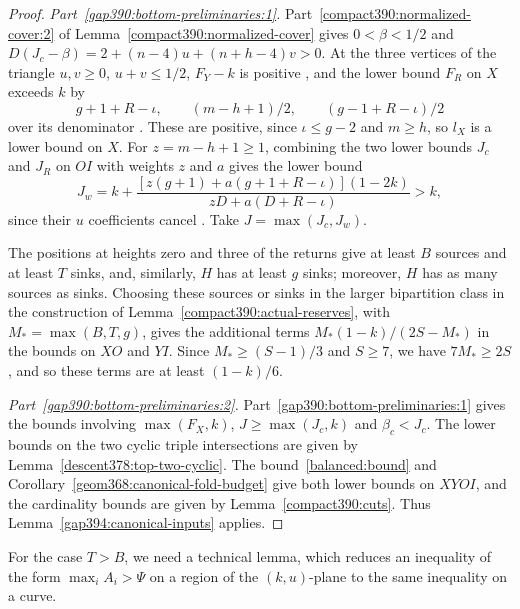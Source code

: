 \begin{proof}
\emph{Part~\ref{gap390:bottom-preliminaries:1}.} Part~\ref{compact390:normalized-cover:2} of Lemma~\ref{compact390:normalized-cover} gives $0<\beta<1/2$ and
$D(J_c-\beta)=2+(n-4)u+(n+h-4)v>0$.
At the three vertices of the triangle $u,v\ge0$, $u+v\le1/2$, $F_Y-k$ is positive
, and the lower bound $F_R$ on $X$ exceeds $k$ by
\[
 g+1+R-\iota,\qquad (m-h+1)/2,\qquad (g-1+R-\iota)/2
\]
over its denominator . These are positive, since $\iota\le g-2$ and $m\ge h$,
so $l_X$ is a lower bound on $X$.
For $z=m-h+1\ge1$, combining the two lower bounds $J_c$ and $J_R$ on $OI$ with weights $z$ and $a$ gives the lower bound
\[
 J_w=k+
 \frac{[z(g+1)+a(g+1+R-\iota)](1-2k)}
 {zD+a(D+R-\iota)}>k,
\]
since their $u$ coefficients cancel .
Take $J=\max(J_c,J_w)$.

The positions at heights zero and three of the returns give at least $B$ sources and at least $T$ sinks, and, similarly, $H$ has at least
$g$ sinks; moreover, $H$ has as many sources as sinks.
Choosing these sources or sinks in the larger bipartition class in the construction of
Lemma~\ref{compact390:actual-reserves}, with $M_*=\max(B,T,g)$,
gives the additional terms $M_*(1-k)/(2S-M_*)$ in the bounds on $XO$ and $YI$.
Since $M_*\ge(S-1)/3$ and $S\ge7$, we have $7M_*\ge2S$, and so these terms are at least $(1-k)/6$.

\emph{Part~\ref{gap390:bottom-preliminaries:2}.} Part~\ref{gap390:bottom-preliminaries:1} gives the bounds involving
$\max(F_X,k)$, $J\ge\max(J_c,k)$ and $\beta_c<J_c$.
The lower bounds on the two cyclic triple intersections are given by
Lemma~\ref{descent378:top-two-cyclic}. The bound~\eqref{balanced:bound}
and Corollary~\ref{geom368:canonical-fold-budget} give both lower bounds on $XYOI$, and the cardinality bounds are given by
Lemma~\ref{compact390:cuts}. Thus Lemma~\ref{gap394:canonical-inputs} applies.
\end{proof}

For the case $T>B$, we need a technical lemma, which reduces an inequality of the form $\max_iA_i>\Psi$ on a region of the $(k,u)$-plane to the same inequality on a curve.

